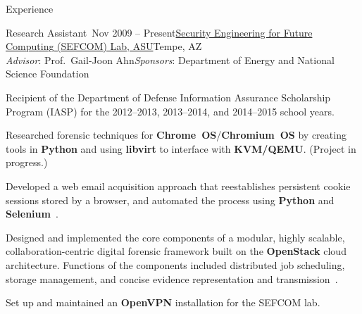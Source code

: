 
\begin{rSection}{Experience}


\begin{rSubsection}{Research Assistant~}{Nov 2009 -- Present}{\href{http://sefcom.asu.edu/}{Security Engineering for Future Computing (SEFCOM) Lab, ASU}}{Tempe, AZ\\{\textnormal{\textit{Advisor}: Prof.\ Gail-Joon Ahn\hfill \textit{Sponsors}: Department of Energy and National Science Foundation}}}

	\item Recipient of the Department of Defense Information Assurance Scholarship Program (IASP) for the 2012--2013, 2013--2014, and 2014--2015 school years.

	\item Researched forensic techniques for \textbf{Chrome~OS}/\textbf{Chromium~OS} by creating tools in \textbf{Python} and using \textbf{libvirt} to interface with \textbf{KVM/QEMU}. (Project in progress.)

	\item Developed a web email acquisition approach that reestablishes persistent cookie sessions stored by a browser, and automated the process using \textbf{Python} and \textbf{Selenium}~\cite{Paglierani2013}.

	\item Designed and implemented the core components of a modular, highly scalable, collaboration-centric digital forensic framework built on the \textbf{OpenStack} cloud architecture. Functions of the components included distributed job scheduling, storage management, and concise evidence representation and transmission~\cite{Mabey2011a,Mabey2011}.

	\item Set up and maintained an \textbf{OpenVPN} installation for the SEFCOM lab.



\end{rSubsection}
\end{rSection}
